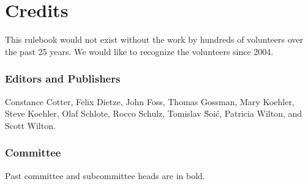 \part{Credits}

This rulebook would not exist without the work by hundreds of volunteers over the past 25 years.
We would like to recognize the volunteers since 2004.

\section{Editors and Publishers}
Constance Cotter,
Felix Dietze,
John Foss,
Thomas Gossman,
Mary  Koehler,
Steve Koehler,
Olaf Schlote,
Rocco Schulz,
Tomislav \u{S}oi\'{c},
Patricia Wilton,
and Scott Wilton.

\section{Committee}

Past committee and subcommittee heads are in bold.

